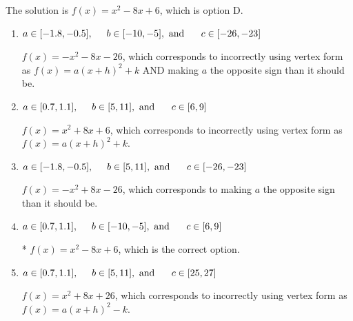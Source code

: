 \documentclass{extbook}[14pt]
\begin{document}
\begin{enumerate}
{The solution is \( f(x) = x^{2} -8 x + 6 \), which is option D.\begin{enumerate}[label=\Alph*.]
\item \( a \in [-1.8, -0.5], \hspace*{5mm} b \in [-10, -5], \text{ and } \hspace*{5mm} c \in [-26, -23] \)

$f(x)=-x^{2} -8 x -26$, which corresponds to incorrectly using vertex form as $f(x) = a(x+h)^2+k$ AND making $a$ the opposite sign than it should be.
\item \( a \in [0.7, 1.1], \hspace*{5mm} b \in [5, 11], \text{ and } \hspace*{5mm} c \in [6, 9] \)

$f(x)=x^{2} +8 x + 6$, which corresponds to incorrectly using vertex form as $f(x) = a(x+h)^2+k$.
\item \( a \in [-1.8, -0.5], \hspace*{5mm} b \in [5, 11], \text{ and } \hspace*{5mm} c \in [-26, -23] \)

$f(x)=-x^{2} +8 x -26$, which corresponds to making $a$ the opposite sign than it should be.
\item \( a \in [0.7, 1.1], \hspace*{5mm} b \in [-10, -5], \text{ and } \hspace*{5mm} c \in [6, 9] \)

* $f(x)=x^{2} -8 x + 6$, which is the correct option.
\item \( a \in [0.7, 1.1], \hspace*{5mm} b \in [5, 11], \text{ and } \hspace*{5mm} c \in [25, 27] \)

$f(x)=x^{2} +8 x + 26$, which corresponds to incorrectly using vertex form as $f(x) = a(x+h)^2 - k$.
\end{enumerate}

}
\end{enumerate}
\end{document}
